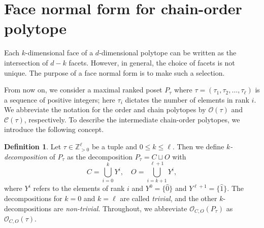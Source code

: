 \documentclass[12pt,a4paper]{amsart}
\theoremstyle{definition}
\newtheorem{definition}[theorem]{Definition}
\newcommand{\OP}{\mathcal{O}}
\newcommand{\CP}{\mathcal{C}}
\newcommand{\Z}{\mathbb{Z}}
\begin{document}
\section{Face normal form for chain-order polytope}\label{sec-normal}
Each $k$-dimensional face of a $d$-dimensional polytope can be written as the intersection of $d-k$ facets.
However, in general, the choice of facets is not unique.
The purpose of a face normal form is to make such a selection.

From now on, we consider a maximal ranked poset $P_\tau$ where $\tau=(\tau_1,\tau_2,\dots,\tau_\ell)$ is a sequence of positive integers; here $\tau_i$ dictates the number of elements in rank $i$.
We abbreviate the notation for the order and chain polytopes by $\OP(\tau)$ and $\CP(\tau)$, respectively.
To describe the intermediate chain-order polytopes, we introduce the following concept.
\begin{definition}
  Let $\tau\in\Z_{> 0}^\ell$ be a tuple and $0\leq k\leq \ell$.
  Then we define \textit{$k$-decomposition} of $P_{\tau}$ as the decomposition $P_\tau=C\sqcup O$ with
  \begin{equation*}
    C=\bigcup\limits_{i=0}^{k}Y^{{i}},\hspace{1em}O=\bigcup\limits_{i=k+1}^{\ell+1}Y^{{i}},
  \end{equation*}
where $Y^{i}$ refers to the elements of rank $i$ and $Y^{0}=\{\hat{0}\}$ and $Y^{\ell+1}=\{\hat{1}\}$.
The decompositions for $k=0$ and $k=\ell$ are called \textit{trivial}, and the other $k$-decompositions are \textit{non-trivial}.
Throughout, we abbreviate $\OP_{C,O}(P_{\tau})$ as $\OP_{C,O}(\tau)$.
\end{definition}
\end{document}
